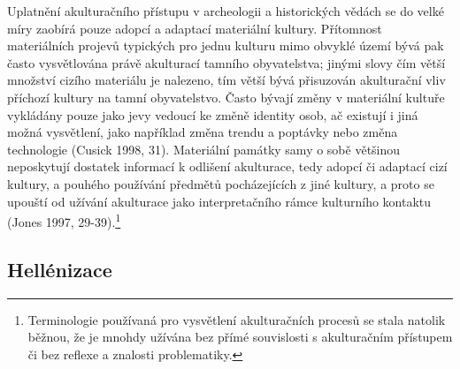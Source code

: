 Uplatnění akulturačního přístupu v archeologii a historických vědách se do velké míry zaobírá pouze adopcí a adaptací materiální kultury. Přítomnost materiálních projevů typických pro jednu kulturu mimo obvyklé území bývá pak často vysvětlována právě akulturací tamního obyvatelstva; jinými slovy čím větší množství cizího materiálu je nalezeno, tím větší bývá přisuzován akulturační vliv příchozí kultury na tamní obyvatelstvo. Často bývají změny v materiální kultuře vykládány pouze jako jevy vedoucí ke změně identity osob, ač existují i jiná možná vysvětlení, jako například změna trendu a poptávky nebo změna technologie (Cusick 1998, 31). Materiální památky samy o sobě většinou neposkytují dostatek informací k odlišení akulturace, tedy adopcí či adaptací cizí kultury, a pouhého používání předmětů pocházejících z jiné kultury, a proto se upouští od užívání akulturace jako interpretačního rámce kulturního kontaktu (Jones 1997, 29-39).\footnote{Terminologie používaná pro vysvětlení akulturačních procesů se stala natolik běžnou, že je mnohdy užívána bez přímé souvislosti s akulturačním přístupem či bez reflexe a znalosti problematiky.}

\subsection[hellénizace]{Hellénizace}

